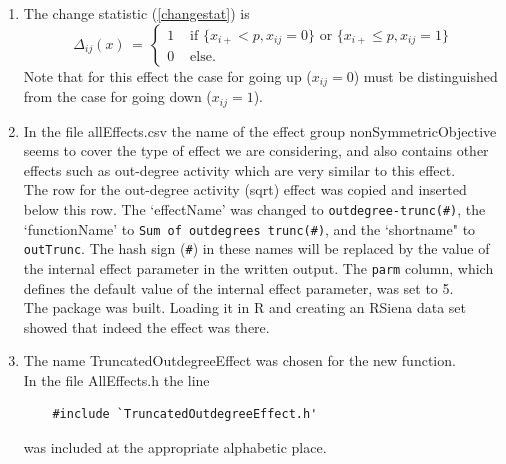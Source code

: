 \documentclass[a4paper,fleqn,11pt]{article}
\newcommand{\+}{\, + \,}
\newcommand{\sfn}[1]{\textsf{#1}}
\newcommand{\R}{{\sf R }}
\newcommand{\RS}{{\sf \textsf{RSiena} }}
\begin{document}
\begin{enumerate}
\item The change statistic (\ref{changestat}) is
      \begin{equation}
       \Delta_{ij}(x) \,=\, \left\{ \begin{array}{ll}
                   1 & \text{  if } \{x_{i+} < p,  x_{ij} = 0 \}
                     \text{ or } \{x_{i+} \leq p,  x_{ij} = 1 \} \\
                   0 & \text{  else. }
                   \end{array}         \right.  \label{outTrunc_cs}
      \end{equation}
      Note that for this effect the case for going up ($x_{ij} = 0$)
      must be distinguished from the case
      for going down ($x_{ij} = 1$).
\item In the file \textsf{allEffects.csv} the name of the
      effect group \textsf{nonSymmetricObjective} seems to cover the
      type of effect we are considering, and also contains other effects
      such as out-degree activity which are very similar to this
      effect.\\
      The row for the out-degree activity (sqrt) effect was copied
      and inserted below this row. The `effectName' was changed to
      \texttt{outdegree-trunc(\#)}, the `functionName' to
      \texttt{Sum of outdegrees trunc(\#)},
      and the `shortname" to \texttt{outTrunc}.
      The hash sign (\texttt{\#}) in these names will be replaced
      by the value of the
      internal effect parameter in the written output.
      The \texttt{parm} column, which defines
      the default value of the internal effect parameter, was set to 5.
      \\
      The package was built. Loading it in \R and creating an
      \RS data set showed that indeed the effect was there.
\item The name \sfn{TruncatedOutdegreeEffect} was chosen for the new function.\\
      In the file \textsf{AllEffects.h} the line
      \begin{verbatim}
    #include `TruncatedOutdegreeEffect.h'
      \end{verbatim}
      was included at the appropriate alphabetic place.


\end{enumerate}
\end{document}
